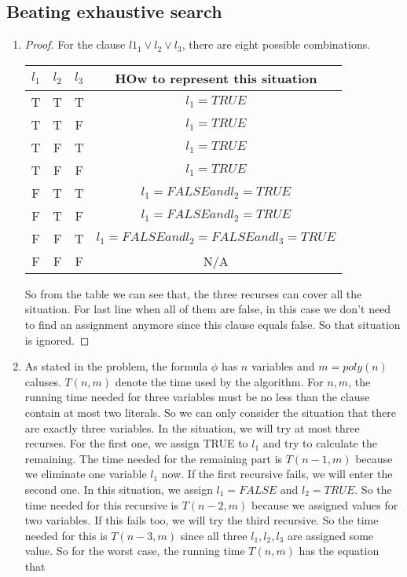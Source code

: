 \documentclass{article}
\begin{document}
\begin{enumerate}
	\section{Beating exhaustive search}
		\begin{enumerate}
			\item \begin{proof}
				For the clause $l1_1 \vee l_2 \vee l_3$, there are eight possible combinations. \begin{tabular}{|c|c|c|c|}
				\hline
				$l_1$ & $l_2$ & $l_3$ & HOw to represent this situation \\
				\hline
				T & T & T & $l_1 = TRUE$ \\
				\hline
				T & T & F & $l_1 = TRUE$ \\
				\hline
				T & F & T & $l_1 = TRUE$ \\
				\hline
				T & F & F & $l_1 = TRUE$ \\
				\hline
				F & T & T & $l_1 = FALSE and l_2 = TRUE$ \\
				\hline
				F & T & F & $l_1 = FALSE and l_2 = TRUE$ \\
				\hline
				F & F & T & $l_1 = FALSE and l_2 = FALSE and l_3 = TRUE$ \\
				\hline
				F & F & F & N/A \\
				\hline
			\end{tabular}
			So from the table we can see that, the three recurses can cover all the situation. For last line when all of them are false, in this case we don't need to find an assignment anymore since this clause equals false. So that situation is ignored. \end{proof}
			\item As stated in the problem, the formula $\phi$ has $n$ variables and $m = poly(n)$ caluses. $T(n, m)$ denote the time used by the algorithm. For $n, m$, the running time needed for three variables must be no less than the clause contain at most two literals. So we can only consider the situation that there are exactly three variables. In the situation, we will try at most three recurses. For the first one, we assign TRUE to $l_1$ and try to calculate the remaining. The time needed for the remaining part is $T(n - 1, m)$ because we eliminate one variable $l_1$ now. If the first recursive fails, we will enter the second one. In this situation, we assign $l_1 = FALSE$ and $l_2 = TRUE$. So the time needed for this recursive is $T(n - 2, m)$ because we assigned values for two variables. If this fails too, we will try the third recursive. So the time needed for this is $T(n - 3, m)$ since all three $l_1, l_2, l_3$ are assigned some value. So for the worst case, the running time $T(n, m)$ has the equation that

\end{enumerate}
\end{enumerate}
\end{document}
